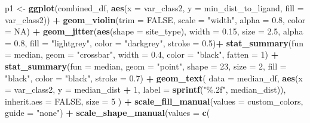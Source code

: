 \documentclass[
]{article}
\newenvironment{Shaded}{\begin{snugshade}}{\end{snugshade}}
\newcommand{\AttributeTok}[1]{\textcolor[rgb]{0.13,0.29,0.53}{#1}}
\newcommand{\ConstantTok}[1]{\textcolor[rgb]{0.56,0.35,0.01}{#1}}
\newcommand{\DecValTok}[1]{\textcolor[rgb]{0.00,0.00,0.81}{#1}}
\newcommand{\FloatTok}[1]{\textcolor[rgb]{0.00,0.00,0.81}{#1}}
\newcommand{\FunctionTok}[1]{\textcolor[rgb]{0.13,0.29,0.53}{\textbf{#1}}}
\newcommand{\NormalTok}[1]{#1}
\newcommand{\OtherTok}[1]{\textcolor[rgb]{0.56,0.35,0.01}{#1}}
\newcommand{\SpecialCharTok}[1]{\textcolor[rgb]{0.81,0.36,0.00}{\textbf{#1}}}
\newcommand{\StringTok}[1]{\textcolor[rgb]{0.31,0.60,0.02}{#1}}
\begin{document}
\begin{Shaded}
\begin{Highlighting}[]
\NormalTok{p1 }\OtherTok{\textless{}{-}} \FunctionTok{ggplot}\NormalTok{(combined\_df, }\FunctionTok{aes}\NormalTok{(}\AttributeTok{x =}\NormalTok{ var\_class2, }\AttributeTok{y =}\NormalTok{ min\_dist\_to\_ligand, }\AttributeTok{fill =}\NormalTok{ var\_class2)) }\SpecialCharTok{+}
  \FunctionTok{geom\_violin}\NormalTok{(}\AttributeTok{trim =} \ConstantTok{FALSE}\NormalTok{, }\AttributeTok{scale =} \StringTok{"width"}\NormalTok{, }\AttributeTok{alpha =} \FloatTok{0.8}\NormalTok{, }\AttributeTok{color =} \ConstantTok{NA}\NormalTok{) }\SpecialCharTok{+}
 \FunctionTok{geom\_jitter}\NormalTok{(}\FunctionTok{aes}\NormalTok{(}\AttributeTok{shape =}\NormalTok{ site\_type), }\AttributeTok{width =} \FloatTok{0.15}\NormalTok{, }\AttributeTok{size =} \FloatTok{2.5}\NormalTok{, }\AttributeTok{alpha =} \FloatTok{0.8}\NormalTok{,}
            \AttributeTok{fill =} \StringTok{"lightgrey"}\NormalTok{, }\AttributeTok{color =} \StringTok{"darkgrey"}\NormalTok{, }\AttributeTok{stroke =} \FloatTok{0.5}\NormalTok{)}\SpecialCharTok{+}
  \FunctionTok{stat\_summary}\NormalTok{(}\AttributeTok{fun =}\NormalTok{ median, }\AttributeTok{geom =} \StringTok{"crossbar"}\NormalTok{, }\AttributeTok{width =} \FloatTok{0.4}\NormalTok{, }\AttributeTok{color =} \StringTok{"black"}\NormalTok{, }\AttributeTok{fatten =} \DecValTok{1}\NormalTok{) }\SpecialCharTok{+}
  \FunctionTok{stat\_summary}\NormalTok{(}\AttributeTok{fun =}\NormalTok{ median, }\AttributeTok{geom =} \StringTok{"point"}\NormalTok{, }\AttributeTok{shape =} \DecValTok{23}\NormalTok{, }\AttributeTok{size =} \DecValTok{2}\NormalTok{, }\AttributeTok{fill =} \StringTok{"black"}\NormalTok{, }\AttributeTok{color =} \StringTok{"black"}\NormalTok{, }\AttributeTok{stroke =} \FloatTok{0.7}\NormalTok{) }\SpecialCharTok{+}
  \FunctionTok{geom\_text}\NormalTok{(}
    \AttributeTok{data =}\NormalTok{ median\_df,}
    \FunctionTok{aes}\NormalTok{(}\AttributeTok{x =}\NormalTok{ var\_class2, }\AttributeTok{y =}\NormalTok{  median\_dist }\SpecialCharTok{+} \DecValTok{1}\NormalTok{, }\AttributeTok{label =} \FunctionTok{sprintf}\NormalTok{(}\StringTok{"\%.2f"}\NormalTok{,  median\_dist)),}
    \AttributeTok{inherit.aes =} \ConstantTok{FALSE}\NormalTok{,}
    \AttributeTok{size =} \DecValTok{5}
\NormalTok{  ) }\SpecialCharTok{+}
  \FunctionTok{scale\_fill\_manual}\NormalTok{(}\AttributeTok{values =}\NormalTok{ custom\_colors, }\AttributeTok{guide =} \StringTok{"none"}\NormalTok{) }\SpecialCharTok{+}
  \FunctionTok{scale\_shape\_manual}\NormalTok{(}\AttributeTok{values =} \FunctionTok{c}\NormalTok{(}

\end{Highlighting}
\end{Shaded}
\end{document}
